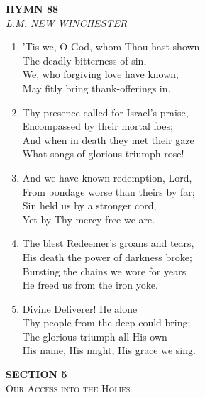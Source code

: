 \documentclass[11pt,a4paper]{article}
\begin{document}
\newpage
\begin{center}
    {\Large \textbf{HYMN 88}}
    \\
    \textit{L.M. NEW WINCHESTER}
\end{center}
\vspace{1em}

\begin{enumerate}
    \item 'Tis we, O God, whom Thou hast shown \\
        The deadly bitterness of sin, \\
        We, who forgiving love have known, \\
        May fitly bring thank-offerings in.

    \item Thy presence called for Israel's praise, \\
        Encompassed by their mortal foes; \\
        And when in death they met their gaze \\
        What songs of glorious triumph rose!

    \item And we have known redemption, Lord, \\
        From bondage worse than theirs by far; \\
        Sin held us by a stronger cord, \\
        Yet by Thy mercy free we are.

    \item The blest Redeemer's groans and tears, \\
        His death the power of darkness broke; \\
        Bursting the chains we wore for years \\
        He freed us from the iron yoke.

    \item Divine Deliverer! He alone \\
        Thy people from the deep could bring; \\
        The glorious triumph all His own--- \\
        His name, His might, His grace we sing.

\end{enumerate}
\newpage
\thispagestyle{empty}
\vspace*{3.5cm}
\begin{center}
    {\LARGE \textbf{SECTION 5}}\\[0.8em]
    {\Large \textsc{Our Access into the Holies}}
\end{center}
\vspace{3.5cm}
\end{document}
